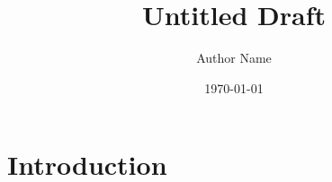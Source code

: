 \documentclass[11pt]{article}
\title{Untitled Draft}
\author{Author Name}
\date{\today}
\begin{document}
\maketitle

\begin{abstract}
\end{abstract}

\section{Introduction}



\end{document}
